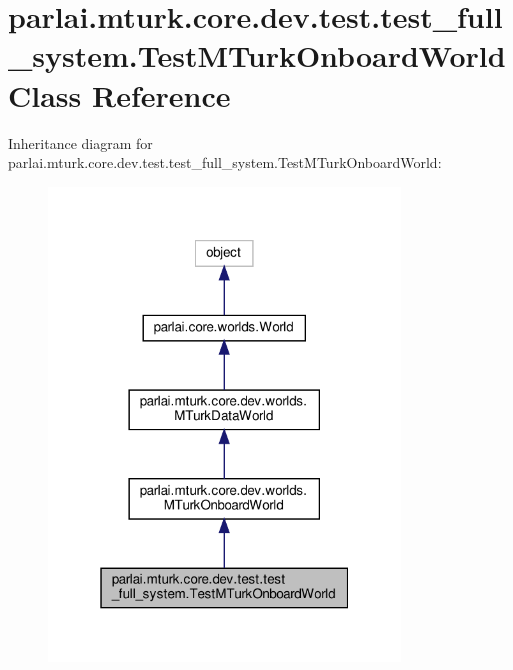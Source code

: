 \hypertarget{classparlai_1_1mturk_1_1core_1_1dev_1_1test_1_1test__full__system_1_1TestMTurkOnboardWorld}{}\section{parlai.\+mturk.\+core.\+dev.\+test.\+test\+\_\+full\+\_\+system.\+Test\+M\+Turk\+Onboard\+World Class Reference}
\label{classparlai_1_1mturk_1_1core_1_1dev_1_1test_1_1test__full__system_1_1TestMTurkOnboardWorld}


Inheritance diagram for parlai.\+mturk.\+core.\+dev.\+test.\+test\+\_\+full\+\_\+system.\+Test\+M\+Turk\+Onboard\+World\+:\nopagebreak
\begin{figure}[H]
\begin{center}
\leavevmode
\includegraphics[width=265pt]{dc/deb/classparlai_1_1mturk_1_1core_1_1dev_1_1test_1_1test__full__system_1_1TestMTurkOnboardWorld__inherit__graph}
\end{center}
\end{figure}


